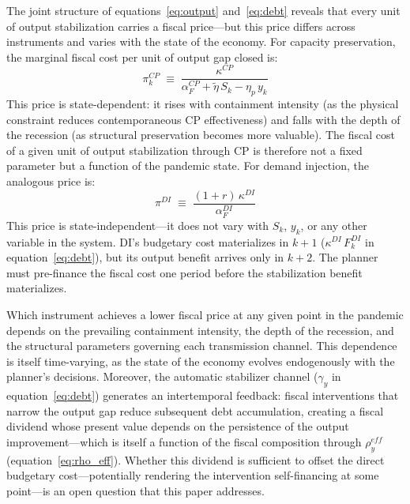 \documentclass[12pt, a4paper]{article}
\begin{document}
The joint structure of equations~\eqref{eq:output} and~\eqref{eq:debt} reveals that every unit of output stabilization carries a fiscal price---but this price differs across instruments and varies with the state of the economy. For capacity preservation, the marginal fiscal cost per unit of output gap closed is:
%
\begin{equation}
    \pi^{CP}_k \;\equiv\; 
    \frac{\kappa^{CP}}{\alpha^{CP}_F + \tilde{\eta}\,S_k - \eta_p\,y_k}
    \label{eq:price_CP}
\end{equation}
%
This price is state-dependent: it rises with containment intensity (as the physical constraint reduces contemporaneous CP effectiveness) and falls with the depth of the recession (as structural preservation becomes more valuable). The fiscal cost of a given unit of output stabilization 
through CP is therefore not a fixed parameter but a function of 
the pandemic state. For demand injection, the analogous price is:
%
\begin{equation}
    \pi^{DI} \;\equiv\; 
    \frac{(1+r)\,\kappa^{DI}}{\alpha^{DI}_F}
    \label{eq:price_DI}
\end{equation}
%
This price is state-independent---it does not vary with $S_k$, $y_k$, 
or any other variable in the system. DI's budgetary cost materializes 
in $k+1$ ($\kappa^{DI}\,F^{DI}_k$ in equation~\ref{eq:debt}), but its 
output benefit arrives only in $k+2$. The planner must pre-finance the fiscal cost one period before the stabilization benefit materializes.

Which instrument achieves a lower fiscal price at any given point 
in the pandemic depends on the prevailing containment intensity, 
the depth of the recession, and the structural parameters governing 
each transmission channel. This dependence is itself time-varying, 
as the state of the economy evolves endogenously with the planner's 
decisions. Moreover, the automatic stabilizer channel ($\gamma_y$ 
in equation~\ref{eq:debt}) generates an intertemporal feedback: 
fiscal interventions that narrow the output gap reduce subsequent 
debt accumulation, creating a fiscal dividend whose present value 
depends on the persistence of the output improvement---which is 
itself a function of the fiscal composition through $\rho^{eff}_y$ 
(equation~\ref{eq:rho_eff}). Whether this dividend is sufficient 
to offset the direct budgetary cost---potentially rendering the 
intervention self-financing at some point---is an open question that this paper addresses.
\end{document}

